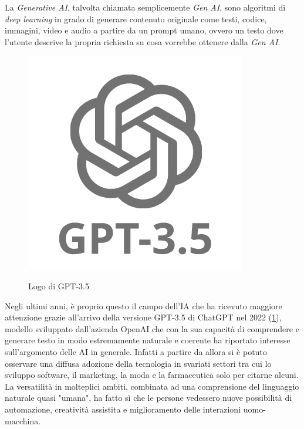 La \textit{Generative AI}, talvolta chiamata semplicemente \textit{Gen AI}, sono algoritmi di \textit{deep learning} in grado di generare contenuto originale come testi, codice, immagini, video e audio a partire da un prompt umano, ovvero un testo dove l'utente descrive la propria richiesta su cosa vorrebbe ottenere dalla \textit{Gen AI}. \\

\begin{figure}[H]
    \centering
    \includegraphics[alt={Logo di ChaGPT GPT-3.5}, width=0.3\columnwidth]{img/gpt-3-5-logo.png}
    \caption{Logo di GPT-3.5}
    \label{fig:gpt-logo}
\end{figure}

Negli ultimi anni, è proprio questo il campo dell'IA che ha ricevuto maggiore attenzione grazie all'arrivo della versione GPT-3.5 di ChatGPT nel 2022 (\ref{fig:gpt-logo}), modello sviluppato dall'azienda OpenAI che con la sua capacità di comprendere e generare testo in modo estremamente naturale e coerente ha riportato interesse sull'argomento delle AI in generale. Infatti a partire da allora si è potuto osservare una diffusa adozione della tecnologia in svariati settori tra cui lo sviluppo software, il marketing, la moda e la farmaceutica solo per citarne alcuni.
La versatilità in molteplici ambiti, combinata ad una comprensione del linguaggio naturale quasi "umana", ha fatto sì che le persone vedessero nuove possibilità di automazione, creatività assistita e miglioramento delle interazioni uomo-macchina.\\


